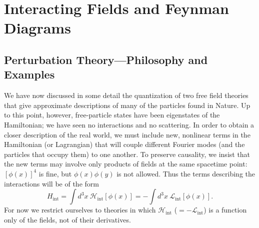 \chapter{Interacting Fields and Feynman Diagrams}

\section{Perturbation Theory---Philosophy and Examples}

We have now discussed in some detail the quantization of two free field
theories that give approximate descriptions of many of the particles found in
Nature.  Up to this point, however, free-particle states have been
eigenstates of the Hamiltonian; we have seen no interactions and no
scattering.  In order to obtain a closer description of the real world, we
must include new, nonlinear terms in the Hamiltonian (or Lagrangian) that
will couple different Fourier modes (and the particles that occupy them) to
one another.  To preserve causality, we insist that the new terms may
involve only products of fields at the same spacetime point:
$[\phi(x)]^4$ is fine, but $\phi(x)\phi(y)$ is not allowed.  Thus the terms
describing the interactions will be of the form
\begin{equation}
  H_{\mathrm{int}} = \int d^3x\ \mathcal{H}_{\mathrm{int}}[\phi(x)]
  = -\int d^3x\ \mathcal{L}_{\mathrm{int}}[\phi(x)] .
\end{equation}
For now we restrict ourselves to theories in which
$\mathcal{H}_{\mathrm{int}}$ ($= -\mathcal{L}_{\mathrm{int}}$) is a function
only of the fields, not of their derivatives.

